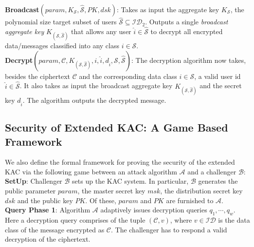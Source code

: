 \noindent\textbf{Broadcast}$(param,K_{\mathcal{S}},\hat{\mathcal{S}},PK,dsk)$: Takes as input the aggregate key $K_{\mathcal{S}}$, the polynomial size target subset of users $\hat{\mathcal{S}}\subseteq\mathcal{ID}_2$. Outputs a single \emph{broadcast aggregate key} $K_{\left(\mathcal{S},\hat{\mathcal{S}}\right)}$ that allows any user $\hat{i}\in\hat{\mathcal{S}}$ to decrypt all encrypted data/messages classified into any class $i\in\mathcal{S}$.\\

\noindent\textbf{Decrypt}$(param,\mathcal{C},K_{\left(\mathcal{S},\hat{\mathcal{S}}\right)},i,\hat{i},d_{\hat{i}},\mathcal{S},\hat{\mathcal{S}})$: The decryption algorithm now takes, besides the ciphertext $\mathcal{C}$ and the corresponding data class $i\in\mathcal{S}$, a valid user id $\hat{i}\in\hat{\mathcal{S}}$. It also takes as input the broadcast aggregate key $K_{\left(\mathcal{S},\hat{\mathcal{S}}\right)}$ and the secret key $d_{\hat{i}}$. The algorithm outputs the decrypted message.\\


\subsection{Security of Extended KAC: A Game Based Framework}
\label{subsec:gameextended}

We also define the formal framework for proving the security of the extended KAC via the following game between an attack algorithm $\mathcal{A}$ and a challenger $\mathcal{B}$:\\

\noindent\textbf{SetUp}: Challenger $\mathcal{B}$ sets up the KAC system. In particular, $\mathcal{B}$ generates the public parameter $param$, the master secret key $msk$, the distribution secret key $dsk$ and the public key $PK$. Of these, $param$ and $PK$ are furnished to $\mathcal{A}$.\\
 
\noindent\textbf{Query Phase 1}: Algorithm $\mathcal{A}$ adaptively issues decryption queries $q_1,\cdots,q_w$. Here a decryption query comprises of the tuple $(\mathcal{C},v)$, where $v\in\mathcal{ID}$ is the data class of the message encrypted as $\mathcal{C}$. The challenger has to respond a valid decryption of the ciphertext.\\
 
